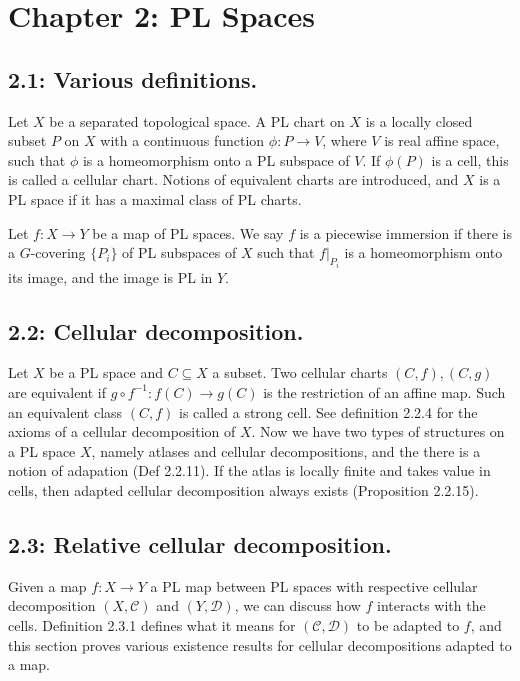\documentclass[12pt,reqno]{amsart}
\theoremstyle{definition}
\theoremstyle{remark}
\theoremstyle{citedrem}
\theoremstyle{cited}
\theoremstyle{citeddef}
\theoremstyle{step}
\begin{document}
\section*{Chapter 2: PL Spaces}
\subsection*{2.1: Various definitions.}
Let $X$ be a separated topological space. A PL chart on $X$ is a locally closed subset $P$ on $X$ with a continuous function $\phi\colon P \to V$, where $V$ is real affine space, such that $\phi$ is a homeomorphism onto a PL subspace of $V$. If $\phi(P)$ is a cell, this is called a cellular chart. Notions of equivalent charts are introduced, and $X$ is a PL space if it has a maximal class of PL charts. 

Let $f\colon X \to Y$ be a map of PL spaces. We say $f$ is a piecewise immersion if there is a $G$-covering $\{P_i\}$ of PL subspaces of $X$ such that $f|_{P_i}$ is a homeomorphism onto its image, and the image is PL in $Y$.

\subsection*{2.2: Cellular decomposition.}

Let $X$ be a PL space and $C \subseteq X$ a subset. Two cellular charts $(C, f), (C, g)$ are equivalent if $g \circ f^{-1} \colon f(C) \to g(C)$ is the restriction of an affine map. Such an equivalent class $(C,f)$ is called a strong cell. See definition 2.2.4 for the axioms of a cellular decomposition of $X$. Now we have two types of structures on a PL space $X$, namely atlases and cellular decompositions, and the there is a notion of adapation (Def 2.2.11). If the atlas is locally finite and takes value in cells, then adapted cellular decomposition always exists (Proposition 2.2.15). 

\subsection*{2.3: Relative cellular decomposition.} Given a map $f \colon X \to Y$ a PL map between PL spaces with respective cellular decomposition $(X, \mathcal{C})$ and $(Y, \mathcal{D})$, we can discuss how $f$ interacts with the cells. Definition 2.3.1 defines what it means for $(\mathcal{C}, \mathcal{D})$ to be adapted to $f$, and this section proves various existence results for cellular decompositions adapted to a map. 
\end{document}
